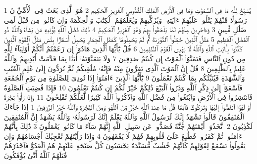 {\tiny\colorbox{cl_aya}{1}} يُسَبِّحُ لِلَّهِ مَا فِى ٱلسَّمَٰوَٰتِ وَمَا فِى ٱلْأَرْضِ ٱلْمَلِكِ ٱلْقُدُّوسِ ٱلْعَزِيزِ ٱلْحَكِيمِ
{\tiny\colorbox{cl_aya}{2}} هُوَ ٱلَّذِى بَعَثَ فِى ٱلْأُمِّيِّۦنَ رَسُولًا مِّنْهُمْ يَتْلُوا۟ عَلَيْهِمْ ءَايَٰتِهِۦ وَيُزَكِّيهِمْ وَيُعَلِّمُهُمُ ٱلْكِتَٰبَ وَٱلْحِكْمَةَ وَإِن كَانُوا۟ مِن قَبْلُ لَفِى ضَلَٰلٍ مُّبِينٍ
{\tiny\colorbox{cl_aya}{3}} وَءَاخَرِينَ مِنْهُمْ لَمَّا يَلْحَقُوا۟ بِهِمْ وَهُوَ ٱلْعَزِيزُ ٱلْحَكِيمُ
{\tiny\colorbox{cl_aya}{4}} ذَٰلِكَ فَضْلُ ٱللَّهِ يُؤْتِيهِ مَن يَشَآءُ وَٱللَّهُ ذُو ٱلْفَضْلِ ٱلْعَظِيمِ
{\tiny\colorbox{cl_aya}{5}} مَثَلُ ٱلَّذِينَ حُمِّلُوا۟ ٱلتَّوْرَىٰةَ ثُمَّ لَمْ يَحْمِلُوهَا كَمَثَلِ ٱلْحِمَارِ يَحْمِلُ أَسْفَارًۢا بِئْسَ مَثَلُ ٱلْقَوْمِ ٱلَّذِينَ كَذَّبُوا۟ بِـَٔايَٰتِ ٱللَّهِ وَٱللَّهُ لَا يَهْدِى ٱلْقَوْمَ ٱلظَّٰلِمِينَ
{\tiny\colorbox{cl_aya}{6}} قُلْ يَٰٓأَيُّهَا ٱلَّذِينَ هَادُوٓا۟ إِن زَعَمْتُمْ أَنَّكُمْ أَوْلِيَآءُ لِلَّهِ مِن دُونِ ٱلنَّاسِ فَتَمَنَّوُا۟ ٱلْمَوْتَ إِن كُنتُمْ صَٰدِقِينَ
{\tiny\colorbox{cl_aya}{7}} وَلَا يَتَمَنَّوْنَهُۥٓ أَبَدًۢا بِمَا قَدَّمَتْ أَيْدِيهِمْ وَٱللَّهُ عَلِيمٌۢ بِٱلظَّٰلِمِينَ
{\tiny\colorbox{cl_aya}{8}} قُلْ إِنَّ ٱلْمَوْتَ ٱلَّذِى تَفِرُّونَ مِنْهُ فَإِنَّهُۥ مُلَٰقِيكُمْ ثُمَّ تُرَدُّونَ إِلَىٰ عَٰلِمِ ٱلْغَيْبِ وَٱلشَّهَٰدَةِ فَيُنَبِّئُكُم بِمَا كُنتُمْ تَعْمَلُونَ
{\tiny\colorbox{cl_aya}{9}} يَٰٓأَيُّهَا ٱلَّذِينَ ءَامَنُوٓا۟ إِذَا نُودِىَ لِلصَّلَوٰةِ مِن يَوْمِ ٱلْجُمُعَةِ فَٱسْعَوْا۟ إِلَىٰ ذِكْرِ ٱللَّهِ وَذَرُوا۟ ٱلْبَيْعَ ذَٰلِكُمْ خَيْرٌ لَّكُمْ إِن كُنتُمْ تَعْلَمُونَ
{\tiny\colorbox{cl_aya}{10}} فَإِذَا قُضِيَتِ ٱلصَّلَوٰةُ فَٱنتَشِرُوا۟ فِى ٱلْأَرْضِ وَٱبْتَغُوا۟ مِن فَضْلِ ٱللَّهِ وَٱذْكُرُوا۟ ٱللَّهَ كَثِيرًا لَّعَلَّكُمْ تُفْلِحُونَ
{\tiny\colorbox{cl_aya}{11}} وَإِذَا رَأَوْا۟ تِجَٰرَةً أَوْ لَهْوًا ٱنفَضُّوٓا۟ إِلَيْهَا وَتَرَكُوكَ قَآئِمًا قُلْ مَا عِندَ ٱللَّهِ خَيْرٌ مِّنَ ٱللَّهْوِ وَمِنَ ٱلتِّجَٰرَةِ وَٱللَّهُ خَيْرُ ٱلرَّٰزِقِينَ
{\tiny\colorbox{cl_aya}{1}} إِذَا جَآءَكَ ٱلْمُنَٰفِقُونَ قَالُوا۟ نَشْهَدُ إِنَّكَ لَرَسُولُ ٱللَّهِ وَٱللَّهُ يَعْلَمُ إِنَّكَ لَرَسُولُهُۥ وَٱللَّهُ يَشْهَدُ إِنَّ ٱلْمُنَٰفِقِينَ لَكَٰذِبُونَ
{\tiny\colorbox{cl_aya}{2}} ٱتَّخَذُوٓا۟ أَيْمَٰنَهُمْ جُنَّةً فَصَدُّوا۟ عَن سَبِيلِ ٱللَّهِ إِنَّهُمْ سَآءَ مَا كَانُوا۟ يَعْمَلُونَ
{\tiny\colorbox{cl_aya}{3}} ذَٰلِكَ بِأَنَّهُمْ ءَامَنُوا۟ ثُمَّ كَفَرُوا۟ فَطُبِعَ عَلَىٰ قُلُوبِهِمْ فَهُمْ لَا يَفْقَهُونَ
{\tiny\colorbox{cl_aya}{4}} وَإِذَا رَأَيْتَهُمْ تُعْجِبُكَ أَجْسَامُهُمْ وَإِن يَقُولُوا۟ تَسْمَعْ لِقَوْلِهِمْ كَأَنَّهُمْ خُشُبٌ مُّسَنَّدَةٌ يَحْسَبُونَ كُلَّ صَيْحَةٍ عَلَيْهِمْ هُمُ ٱلْعَدُوُّ فَٱحْذَرْهُمْ قَٰتَلَهُمُ ٱللَّهُ أَنَّىٰ يُؤْفَكُونَ
